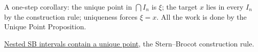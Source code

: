\begin{remark*}
A one-step corollary: the unique point in $\bigcap I_n$ is $\xi$; the
target $x$ lies in every $I_n$ by the construction rule; uniqueness forces
$\xi = x$.  All the work is done by the Unique Point Proposition.
\end{remark*}

\begin{dependencies}
\hyperref[prop:sb-unique-point]{Nested SB intervals contain a unique point},
the Stern--Brocot construction rule.
\end{dependencies}

\clearpage

